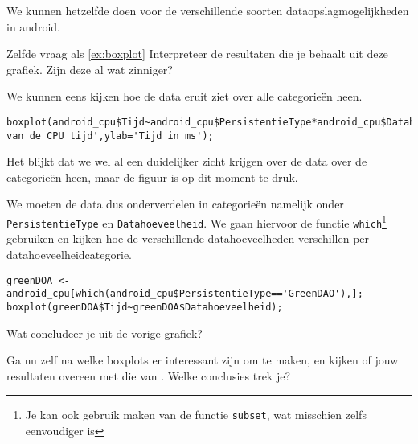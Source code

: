 We kunnen hetzelfde doen voor de verschillende soorten dataopslagmogelijkheden in android.

\begin{exercise}
	Zelfde vraag als \ref{ex:boxplot} Interpreteer de resultaten die je behaalt uit deze grafiek. Zijn deze al wat zinniger?
\end{exercise}

We kunnen eens kijken hoe de data eruit ziet over alle categorie\"en heen.

\begin{lstlisting}
boxplot(android_cpu$Tijd~android_cpu$PersistentieType*android_cpu$Datahoeveelheid,main='Spreiding van de CPU tijd',ylab='Tijd in ms');
\end{lstlisting}

Het blijkt dat we wel al een duidelijker zicht krijgen over de data over de categorie\"en heen, maar de figuur is op dit moment te druk. 

We moeten de data dus onderverdelen in categorie\"en namelijk onder \texttt{PersistentieType} en \texttt{Datahoeveelheid}. We gaan hiervoor de functie \texttt{which}\footnote{Je kan ook gebruik maken van de functie \texttt{subset}, wat misschien zelfs eenvoudiger is} gebruiken en kijken hoe de verschillende datahoeveelheden verschillen per datahoeveelheidcategorie. 

\begin{lstlisting}
greenDOA <- android_cpu[which(android_cpu$PersistentieType=='GreenDAO'),];
boxplot(greenDOA$Tijd~greenDOA$Datahoeveelheid);
\end{lstlisting}

\begin{exercise}
	Wat concludeer je uit de vorige grafiek?
\end{exercise}

\begin{exercise}
	Ga nu zelf na welke boxplots er interessant zijn om te maken, en kijken of jouw resultaten overeen met die van \textcite{Akin2016}. Welke conclusies trek je?
\end{exercise}



